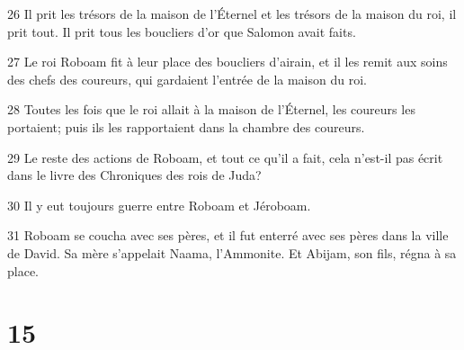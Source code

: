 \par 26 Il prit les trésors de la maison de l'Éternel et les trésors de la maison du roi, il prit tout. Il prit tous les boucliers d'or que Salomon avait faits.
\par 27 Le roi Roboam fit à leur place des boucliers d'airain, et il les remit aux soins des chefs des coureurs, qui gardaient l'entrée de la maison du roi.
\par 28 Toutes les fois que le roi allait à la maison de l'Éternel, les coureurs les portaient; puis ils les rapportaient dans la chambre des coureurs.
\par 29 Le reste des actions de Roboam, et tout ce qu'il a fait, cela n'est-il pas écrit dans le livre des Chroniques des rois de Juda?
\par 30 Il y eut toujours guerre entre Roboam et Jéroboam.
\par 31 Roboam se coucha avec ses pères, et il fut enterré avec ses pères dans la ville de David. Sa mère s'appelait Naama, l'Ammonite. Et Abijam, son fils, régna à sa place.

\chapter{15}

